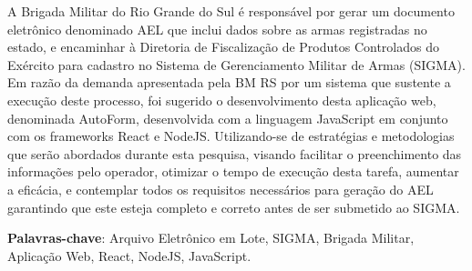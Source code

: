 \setlength{\absparsep}{18pt} %
\begin{resumo}
	A Brigada Militar do Rio Grande do Sul é responsável por gerar um documento eletrônico denominado AEL que inclui dados sobre as armas registradas no estado, e encaminhar à Diretoria de Fiscalização de Produtos Controlados do Exército para cadastro no Sistema de Gerenciamento Militar de Armas (SIGMA). Em razão da demanda apresentada
	pela BM RS por um sistema que sustente a execução deste processo, foi sugerido o desenvolvimento desta aplicação web, denominada AutoForm, desenvolvida com a linguagem JavaScript
	em conjunto com os frameworks React e NodeJS. Utilizando-se de estratégias e metodologias
	que serão abordados durante esta pesquisa, visando facilitar o preenchimento das informações pelo
	operador, otimizar o tempo de execução desta tarefa, aumentar a eficácia, e contemplar todos os
	requisitos necessários para geração do AEL garantindo que este esteja completo e correto antes
	de ser submetido ao SIGMA.

	
	\textbf{Palavras-chave}: Arquivo Eletrônico em Lote, SIGMA, Brigada Militar, Aplicação Web, React, NodeJS,  JavaScript.  %
\end{resumo}